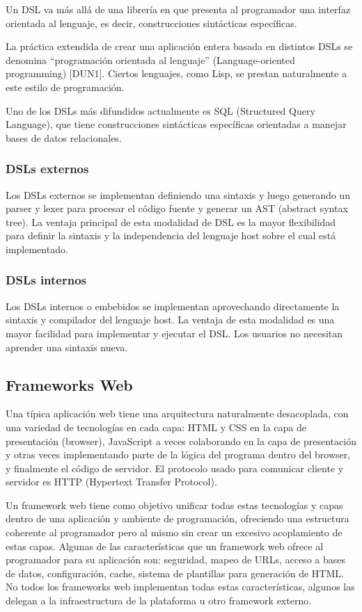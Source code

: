\documentclass[12pt]{article}
\begin{document}
Un DSL va más allá de una librería en que presenta al programador una interfaz orientada al lenguaje, es decir, construcciones sintácticas específicas.

La práctica extendida de crear una aplicación entera basada en distintos DSLs se denomina “programación orientada al lenguaje” (Language-oriented programming) [DUN1]. Ciertos lenguajes, como Lisp, se prestan naturalmente a este estilo de programación.

Uno de los DSLs más difundidos actualmente es SQL (Structured Query Language), que tiene construcciones sintácticas específicas orientadas a manejar bases de datos relacionales.

\subsubsection{DSLs externos}

Los DSLs externos se implementan definiendo una sintaxis y luego generando un parser y lexer para procesar el código fuente y generar un AST (abstract syntax tree). La ventaja principal de esta modalidad de DSL es la mayor flexibilidad para definir la sintaxis y la independencia del lenguaje host sobre el cual está implementado.

\subsubsection{DSLs internos}

Los DSLs internos o embebidos se implementan aprovechando directamente la sintaxis y compilador del lenguaje host. La ventaja de esta modalidad es una mayor facilidad para implementar y ejecutar el DSL. Los usuarios no necesitan aprender una sintaxis nueva.

\subsection{Frameworks Web}

Una típica aplicación web tiene una arquitectura naturalmente desacoplada, con una variedad de tecnologías en cada capa: HTML y CSS en la capa de presentación (browser), JavaScript a veces colaborando en la capa de presentación y otras veces implementando parte de la lógica del programa dentro del browser, y finalmente el código de servidor. El protocolo usado para comunicar cliente y servidor es HTTP (Hypertext Transfer Protocol).

Un framework web tiene como objetivo unificar todas estas tecnologías y capas dentro de una aplicación y ambiente de programación, ofreciendo una estructura coherente al programador pero al mismo sin crear un excesivo acoplamiento de estas capas. Algunas de las características que un framework web ofrece al programador para su aplicación son: seguridad, mapeo de URLs, acceso a bases de datos, configuración, cache, sistema de plantillas para generación de HTML. No todos los frameworks web implementan todas estas características, algunos las delegan a la infraestructura de la plataforma u otro framework externo.
\end{document}
